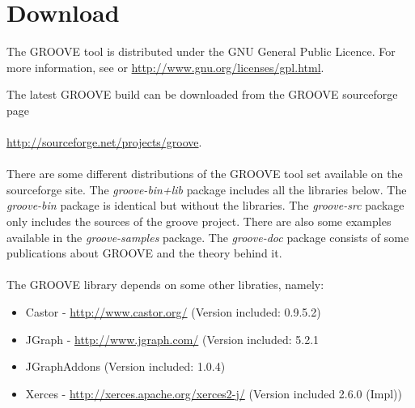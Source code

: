 \section{Download}

The GROOVE tool is distributed under the GNU General Public Licence. For
more information, see  or
\url{http://www.gnu.org/licenses/gpl.html}.


The latest GROOVE build can be downloaded from the GROOVE sourceforge page\\
\\
\url{http://sourceforge.net/projects/groove}.\\
\\
There are some different distributions of the GROOVE tool set available on the sourceforge site. The \emph{groove-bin+lib} package includes all the libraries below. The \emph{groove-bin} package is identical but without the libraries. The \emph{groove-src} package only includes the sources of the groove project. There are also some examples available in the \emph{groove-samples} package. The \emph{groove-doc} package consists of some publications about GROOVE and the theory behind it. 
\\\\
The GROOVE library depends on some other libraties, namely:

\begin{itemize}
\item Castor - \url{http://www.castor.org/} (Version included: 0.9.5.2)
\item JGraph - \url{http://www.jgraph.com/} (Version included: 5.2.1 
\item JGraphAddons (Version included: 1.0.4)
\item Xerces - \url{http://xerces.apache.org/xerces2-j/} (Version included 2.6.0 (Impl))
\end{itemize}





